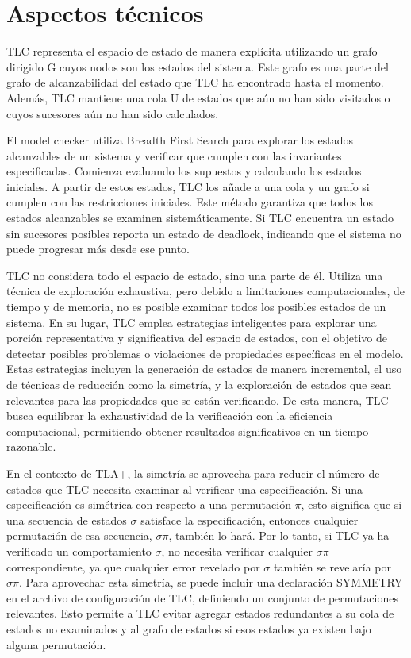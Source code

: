 \documentclass[runningheads]{llncs}
\begin{document}
\section{Aspectos técnicos}
TLC representa el espacio de estado de manera explícita utilizando un grafo dirigido G cuyos nodos son los estados del sistema. Este grafo es una parte del grafo de alcanzabilidad del estado que TLC ha encontrado hasta el momento. Además, TLC mantiene una cola U de estados que aún no han sido visitados o cuyos sucesores aún no han sido calculados.

El model checker utiliza Breadth First Search para explorar los estados alcanzables de un sistema y verificar que cumplen con las invariantes especificadas. Comienza evaluando los supuestos y calculando los estados iniciales. A partir de estos estados, TLC los añade a una cola y un grafo si cumplen con las restricciones iniciales. Este método garantiza que todos los estados alcanzables se examinen sistemáticamente. Si TLC encuentra un estado sin sucesores posibles reporta un estado de deadlock, indicando que el sistema no puede progresar más desde ese punto.

TLC no considera todo el espacio de estado, sino una parte de él. Utiliza una técnica de exploración exhaustiva, pero debido a limitaciones computacionales, de tiempo y de memoria, no es posible examinar todos los posibles estados de un sistema. En su lugar, TLC emplea estrategias inteligentes para explorar una porción representativa y significativa del espacio de estados, con el objetivo de detectar posibles problemas o violaciones de propiedades específicas en el modelo. Estas estrategias incluyen la generación de estados de manera incremental, el uso de técnicas de reducción como la simetría, y la exploración de estados que sean relevantes para las propiedades que se están verificando. De esta manera, TLC busca equilibrar la exhaustividad de la verificación con la eficiencia computacional, permitiendo obtener resultados significativos en un tiempo razonable.

En el contexto de TLA+, la simetría se aprovecha para reducir el número de estados que TLC necesita examinar al verificar una especificación. Si una especificación es simétrica con respecto a una permutación $\pi$, esto significa que si una secuencia de estados $\sigma$ satisface la especificación, entonces cualquier permutación de esa secuencia, $\sigma\pi$, también lo hará. Por lo tanto, si TLC ya ha verificado un comportamiento $\sigma$, no necesita verificar cualquier $\sigma\pi$ correspondiente, ya que cualquier error revelado por $\sigma$ también se revelaría por $\sigma\pi$.
Para aprovechar esta simetría, se puede incluir una declaración SYMMETRY en el archivo de configuración de TLC, definiendo un conjunto de permutaciones relevantes. Esto permite a TLC evitar agregar estados redundantes a su cola de estados no examinados y al grafo de estados si esos estados ya existen bajo alguna permutación.
\end{document}
